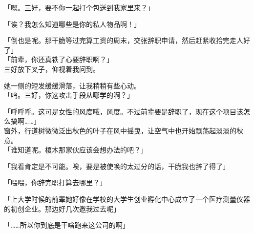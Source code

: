 「嗯。三好，要不你一起打个包送到我家里来？」

「诶？我怎么知道哪些是你的私人物品啊！」

「倒也是呢。那干脆等过完算工资的周末，交张辞职申请，然后赶紧收拾完走人好了」\\

「前辈，你还真铁了心要辞职啊？」\\

三好放下叉子，仰视着我问到。

她一侧的短发缓缓滑落，让我稍稍有些心动。\\

「呜。三好，你这攻击手段从哪学的啊？」

「呼呼呼。这可是女性的风度哦，风度。不过前辈要是辞职了，现在这个项目该怎么搞啊……」\\

窗外，行道树微微泛出秋色的叶子在风中摇曳，让空气中也开始飘荡起淡淡的秋意。\\

「谁知道呢。榎木那家伙应该会想办法的吧？」

「我看肯定是不可能。唉，要是被使唤的太过分的话，干脆我也辞了得了」

「喂喂，你辞完职打算去哪里？」

「上大学时候的前辈她好像在学校的大学生创业孵化中心成立了一个医疗测量仪器的初创企业。那边好几次邀我过去呢」

「……所以你到底是干啥跑来这公司的啊」\\

